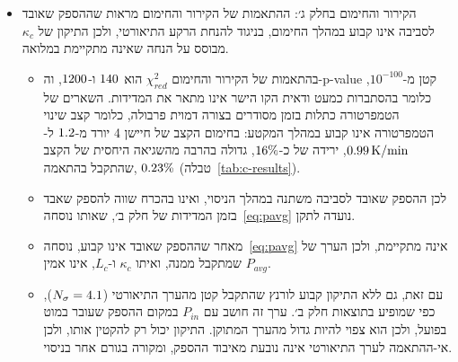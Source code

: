 \documentclass[10pt,a4paper]{article}
\newcommand{\textenglish}[1]{\foreignlanguage{english}{#1}}
\newcommand{\U}[1]{\,\mathrm{#1}}
\begin{document}
\begin{itemize}
\begin{itemize}
    \item הערכת חסר כזו אינה סבירה, כי $\TErr\U{K}$ היא שגיאת החיישנים שנקבעה למערכת הניסוי. אמנם שגיאת הרזולוציה של תוכנת ההקלטה לפי נוסחה (28) בחוברת היא כ-$\TResErr\U{K}$, גדולה מ-$\TErr\U{K}$, אך גם היא רחוקה מ-$\DExpRms\U{K}$.
    \item נוסף על כך, השארים מסודרים בצורה דמוית פרבולה (איור~\ref{fig:c-exp-res}), ולכן ככל הנראה קצב שינוי הטמפרטורה בסוף חלק ב׳ אינו קבוע.
  \end{itemize}
  \item הקירור והחימום בחלק ג׳: ההתאמות של הקירור והחימום מראות שההספק שאובד לסביבה אינו קבוע במהלך החימום, בניגוד להנחת הרקע התיאורטי, ולכן התיקון של $\kappa_c$ מבוסס על הנחה שאינה מתקיימת במלואה.
  \begin{itemize}\setlength{\itemsep}{0pt}\setlength{\parskip}{0pt}
    \item בהתאמות של הקירור והחימום $\chi^2_{red}$ הוא $140$ ו-$1200$, וה-\textenglish{p-value} קטן מ-$10^{-100}$, כלומר בהסתברות כמעט ודאית הקו הישר אינו מתאר את המדידות. השארים של הטמפרטורה כתלות בזמן מסודרים בצורה דמוית פרבולה, כלומר קצב שינוי הטמפרטורה אינו קבוע במהלך המקטע: בחימום הקצב של חיישן 4 יורד מ-$1.2$ ל-$\DHeatRateEnd\U{K/min}$, ירידה של כ-$16\%$, גדולה בהרבה מהשגיאה היחסית של הקצב שהתקבל בהתאמה, $0.23\%$ (טבלה~\ref{tab:c-results}).
    \item לכן ההספק שאובד לסביבה משתנה במהלך הניסוי, ואינו בהכרח שווה להספק שאבד בזמן המדידות של חלק ב׳, שאותו נוסחה~\eqref{eq:pavg} נועדה לתקן.
    \item מאחר שההספק שאובד אינו קבוע, נוסחה~\eqref{eq:pavg} אינה מתקיימת, ולכן הערך של $P_{avg}$ שמתקבל ממנה, ואיתו $\kappa_c$ ו-$L_c$, אינו אמין.
    \item עם זאת, גם ללא התיקון קבוע לורנץ שהתקבל קטן מהערך התיאורטי ($N_\sigma = 4.1$), כפי שמופיע בתוצאות חלק ב׳. ערך זה חושב עם $P_{in}$ במקום ההספק שעובר במוט בפועל, ולכן הוא צפוי להיות גדול מהערך המתוקן. התיקון יכול רק להקטין אותו, ולכן אי-ההתאמה לערך התיאורטי אינה נובעת מאיבוד ההספק, ומקורה בגורם אחר בניסוי.
  \end{itemize}
\end{itemize}
\end{document}
